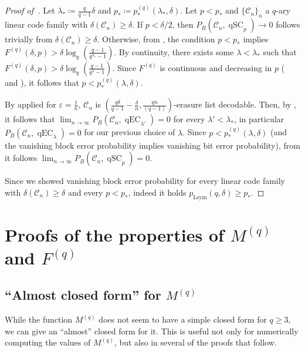 \documentclass{article}
\newcommand{\eps}{\varepsilon}
\DeclareMathOperator{\qSC}{qSC}
\DeclareMathOperator{\qEC}{qEC}
\newcommand{\cC}{\mathcal{C}}
\newcommand{\pLsym}{p_{\mathrm{Lsym}}}
\theoremstyle{plain}
\theoremstyle{plain}
\theoremstyle{plain}
\theoremstyle{plain}
\theoremstyle{plain}
\theoremstyle{plain}
\theoremstyle{plain}
\theoremstyle{plain}
\theoremstyle{plain}
\theoremstyle{plain}
\theoremstyle{remark}
\theoremstyle{remark}
\theoremstyle{remark}
\theoremstyle{plain}
\begin{document}
\begin{proof}[Proof of~]
    Let $\lambda_*\coloneqq \frac{q}{q-1}\delta$
    and $p_*\coloneqq p_*^{(q)}(\lambda_*,\delta)$.
    Let $p<p_*$ and $\{\cC_n\}_n$ a $q$-ary linear code family with
    $\delta(\cC_n)\ge \delta$.
    If $p<\delta/2$, then
    $P_B(\cC_n,\qSC_p)\to 0$ follows trivially
    from $\delta(\cC_n)\ge\delta$.
    Otherwise,
    from , the condition $p<p_*$
    implies $F^{(q)}(\delta,p)>\delta\log_q\left(\frac{q-1}{q^{\lambda_*}-1}\right)$. By continuity, there exists
    some $\lambda<\lambda_*$ such that
    $F^{(q)}(\delta,p)>\delta\log_q\left(\frac{q-1}{q^{\lambda}-1}\right)$.
    Since $F^{(q)}$ is continuous and decreasing in $p$
    ( and ),
    it follows that $p<p_*^{(q)}(\lambda, \delta)$.
    
    By  applied for $\eps=\frac{1}{n}$, $\cC_n$ is $\left(\frac{q\delta}{q-1}-\frac{\delta}{n},\frac{qn}{(q-1)}\right)$-erasure list decodable. Then, by , it follows that 
    $\lim_{n\to\infty}P_{B}(\cC_n,\qEC_{\lambda'})=0$ for every $\lambda'<\lambda_*$, in particular
    $P_{B}(\cC_n,\qEC_{\lambda})=0$ for our previous choice of $\lambda$.
    Since $p<p_*^{(q)}(\lambda,\delta)$
    (and the vanishing block error probability implies
    vanishing bit error probability), from
     it follows $\lim_{n\to\infty}P_B(\cC_n,\qSC_p)=0$.

    Since we showed vanishing block error probability for
    every linear code family with $\delta(\cC_n)\ge\delta$ and every
    $p<p_*$, indeed it holds $\pLsym(q,\delta)\ge p_*$.
\end{proof}

\section{Proofs of the properties of
$M^{(q)}$ and $F^{(q)}$}
\label{sec:m-f-proofs}

\subsection{``Almost closed form''
for $M^{(q)}$
}

While the function $M^{(q)}$ does not
seem to have a simple closed form for
$q\ge 3$, we can give an ``almost''
closed form for it. This is useful not only for
numerically computing the values of
$M^{(q)}$, but also in several of the proofs
that follow.
\end{document}
